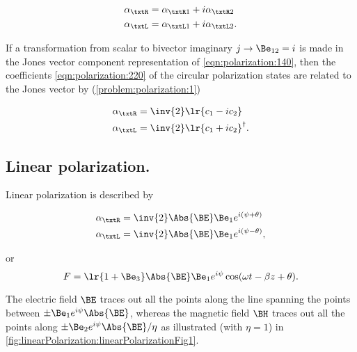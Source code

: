\begin{dmath}\label{eqn:polarization:220}
\begin{aligned}
\alpha_\txtR &= \alpha_{\txtR 1} + i \alpha_{\txtR 2} \\
\alpha_\txtL &= \alpha_{\txtL 1} + i \alpha_{\txtL 2}.
\end{aligned}
\end{dmath}

If a transformation from scalar to bivector imaginary \( j \rightarrow \Be_{12} = i \) is made in the Jones vector component representation of \cref{eqn:polarization:140},
then
the coefficients \cref{eqn:polarization:220} of the circular polarization states are related to the Jones vector by (\cref{problem:polarization:1})

\begin{dmath}\label{eqn:polarization:260}
\begin{aligned}
\alpha_\txtR &= \inv{2}\lr{ c_1 - i c_2 } \\
\alpha_\txtL &= \inv{2}\lr{ c_1 + i c_2 }^\dagger.
\end{aligned}
\end{dmath}

\subsection{Linear polarization.}

Linear polarization is described by

\begin{dmath}\label{eqn:polarization:280}
\begin{aligned}
\alpha_\txtR &= \inv{2}\Abs{\BE} \Be_1 e^{i(\psi + \theta)} \\
\alpha_\txtL &= \inv{2}\Abs{\BE} \Be_1 e^{i(\psi - \theta)},
\end{aligned}
\end{dmath}

or
\begin{dmath}\label{eqn:polarization:300}
F = \lr{ 1 + \Be_3 } \Abs{\BE} \Be_1 e^{i\psi} \cos( \omega t - \beta z + \theta ).
\end{dmath}

The electric field \( \BE \) traces out all the points along the line spanning the points between \( \pm \Be_1 e^{i\psi} \Abs{\BE} \), whereas the magnetic field \( \BH \) traces
out all the points along \( \pm \Be_2 e^{i\psi} \Abs{\BE}/\eta \) as illustrated (with \( \eta = 1 \)) in
\cref{fig:linearPolarization:linearPolarizationFig1}.

